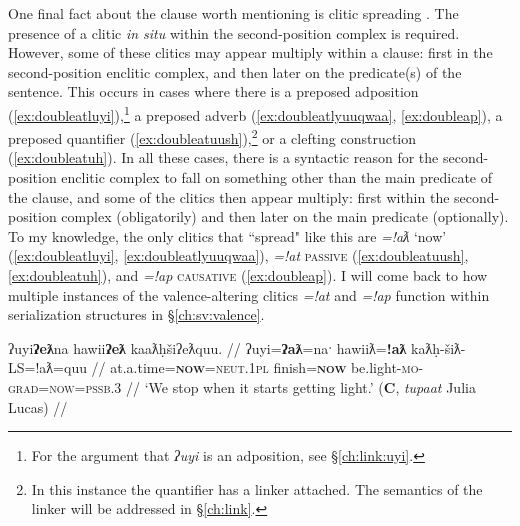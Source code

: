 One final fact about the clause worth mentioning is clitic spreading \citep[p.~254--255]{davidson2002}. The presence of a clitic \textit{in situ} within the second-position complex is required. However, some of these clitics may appear multiply within a clause: first in the second-position enclitic complex, and then later on the predicate(s) of the sentence. This occurs in cases where there is a preposed adposition (\ref{ex:doubleatluyi}),\footnote{For the argument that \textit{ʔuyi} is an adposition, see \S\ref{ch:link:uyi}.} a preposed adverb (\ref{ex:doubleatlyuuqwaa}, \ref{ex:doubleap}), a preposed quantifier (\ref{ex:doubleatuush}),\footnote{In this instance the quantifier has a linker attached. The semantics of the linker will be addressed in \S\ref{ch:link}.} or a clefting construction (\ref{ex:doubleatuh}). In all these cases, there is a syntactic reason for the second-position enclitic complex to fall on something other than the main predicate of the clause, and some of the clitics then appear multiply: first within the second-position complex (obligatorily) and then later on the main predicate (optionally). To my knowledge, the only clitics that ``spread" like this are \textit{=!aƛ} `now' (\ref{ex:doubleatluyi}, \ref{ex:doubleatlyuuqwaa}), \textit{=!at} \textsc{passive} (\ref{ex:doubleatuush}, \ref{ex:doubleatuh}), and \textit{=!ap} \textsc{causative} (\ref{ex:doubleap}). I will come back to how multiple instances of the valence-altering clitics \textit{=!at} and \textit{=!ap} function within serialization structures in \S\ref{ch:sv:valence}. %

\ex \label{ex:doubleatluyi}
\begingl
\glpreamble ʔuyi\textbf{ʔeƛ}na hawii\textbf{ʔeƛ} kaaƛḥšiʔeƛquu. //
\gla ʔuyi=\textbf{ʔaƛ}=naˑ hawiiƛ=\textbf{!aƛ} kaƛḥ-šiƛ-LS=!aƛ=quu  //
\glb at.a.time=\textbf{\textsc{now}}=\textsc{neut.1pl} finish=\textbf{\textsc{now}} be.light-\textsc{mo}-\textsc{grad}=\textsc{now}=\textsc{pssb.3} //
\glft `We stop when it starts getting light.' (\textbf{C}, \textit{tupaat} Julia Lucas) //
\endgl
\xe


